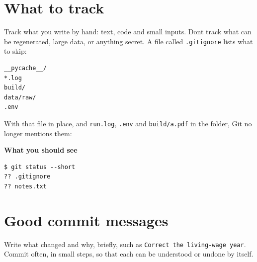 \section{What to track}\label{what-to-track}

Track what you write by hand: text, code and small inputs. Don\textquotesingle t track what can be regenerated, large data, or anything secret. A file called \texttt{.gitignore} lists what to skip:

\begin{lstlisting}[language=text]
__pycache__/
*.log
build/
data/raw/
.env
\end{lstlisting}

With that file in place, and \texttt{run.log}, \texttt{.env} and \texttt{build/a.pdf} in the folder, Git no longer mentions them:

\textbf{What you should see}

\begin{lstlisting}[language=text]
$ git status --short
?? .gitignore
?? notes.txt
\end{lstlisting}

\section{Good commit messages}\label{good-commit-messages}

Write what changed and why, briefly, such as \texttt{Correct\ the\ living-wage\ year}. Commit often, in small steps, so that each can be understood or undone by itself.

